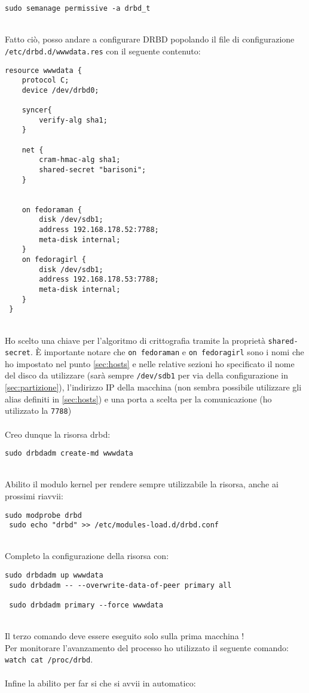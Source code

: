 \begin{lstlisting}[style=cmd]
 sudo semanage permissive -a drbd_t
\end{lstlisting}
\ \\
Fatto ci\`{o}, posso andare a configurare DRBD popolando il file di configurazione \lstinline[style=cmd]|/etc/drbd.d/wwwdata.res| con il seguente contenuto:

\begin{lstlisting}[style=cmd]
 resource wwwdata {
    protocol C;
    device /dev/drbd0;

    syncer{
        verify-alg sha1;
    }

    net {
        cram-hmac-alg sha1;
        shared-secret "barisoni";
    }


    on fedoraman {
        disk /dev/sdb1;
        address 192.168.178.52:7788;
        meta-disk internal;
    }
    on fedoragirl {
        disk /dev/sdb1;
        address 192.168.178.53:7788;
        meta-disk internal;
    }
 }
\end{lstlisting}
\ \\
Ho scelto una chiave per l'algoritmo di crittografia tramite la propriet\`{a} \lstinline[style=cmd]|shared-secret|. \`{E} importante notare che \lstinline[style=cmd]|on fedoraman| e \lstinline[style=cmd]|on fedoragirl| sono i nomi che ho impostato nel punto \autoref{sec:hosts} e nelle relative sezioni ho specificato il nome del disco da utilizzare (sar\`{a} sempre \lstinline[style=cmd]|/dev/sdb1| per via della configurazione in \autoref{sec:partizione}), l'indirizzo IP della macchina (non sembra possibile utilizzare gli alias definiti in \autoref{sec:hosts}) e una porta a scelta per la comunicazione (ho utilizzato la \lstinline[style=cmd]|7788|)\ \\
\ \\
Creo dunque la risorsa drbd:

\begin{lstlisting}[style=cmd]
 sudo drbdadm create-md wwwdata
\end{lstlisting}
\ \\
Abilito il modulo kernel per rendere sempre utilizzabile la risorsa, anche ai prossimi riavvii:

\begin{lstlisting}[style=cmd]
 sudo modprobe drbd
 sudo echo "drbd" >> /etc/modules-load.d/drbd.conf
\end{lstlisting}
\ \\
Completo la configurazione della risorsa con:

\begin{lstlisting}[style=cmd]
 sudo drbdadm up wwwdata
 sudo drbdadm -- --overwrite-data-of-peer primary all
 
 sudo drbdadm primary --force wwwdata
\end{lstlisting}
\ \\
Il terzo comando deve essere eseguito solo sulla prima macchina !\\
Per monitorare l'avanzamento del processo ho utilizzato il seguente comando: \lstinline[style=cmd]|watch cat /proc/drbd|.\\
\ \\
Infine la abilito per far si che si avvii in automatico:

